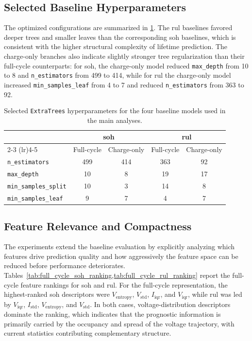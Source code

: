 \subsection{Selected Baseline Hyperparameters}

The optimized configurations are summarized in \cref{tab:baseline_hyperparams}. The \ac{rul} baselines favored deeper trees and smaller leaves than the corresponding \ac{soh} baselines, which is consistent with the higher structural complexity of lifetime prediction. The charge-only branches also indicate slightly stronger tree regularization than their full-cycle counterparts: for \ac{soh}, the charge-only model reduced \texttt{max\_depth} from 10 to 8 and \texttt{n\_estimators} from 499 to 414, while for \ac{rul} the charge-only model increased \texttt{min\_samples\_leaf} from 4 to 7 and reduced \texttt{n\_estimators} from 363 to 92.

\begin{table}[H]
    \centering
    \caption{Selected \texttt{ExtraTrees} hyperparameters for the four baseline models used in the main analyses.}
    \label{tab:baseline_hyperparams}
    \begin{tabular}{lcccc}
    \toprule
     & \multicolumn{2}{c}{\ac{soh}} & \multicolumn{2}{c}{\ac{rul}} \\
    \cmidrule(lr){2-3} \cmidrule(lr){4-5}
     & Full-cycle & Charge-only & Full-cycle & Charge-only \\
    \midrule
    \texttt{n\_estimators} & 499 & 414 & 363 & 92 \\
    \texttt{max\_depth} & 10 & 8 & 19 & 17 \\
    \texttt{min\_samples\_split} & 10 & 3 & 14 & 8 \\
    \texttt{min\_samples\_leaf} & 9 & 7 & 4 & 7 \\
    \bottomrule
    \end{tabular}
\end{table}

\subsection{Feature Relevance and Compactness}

The experiments extend the baseline evaluation by explicitly analyzing which features drive prediction quality and how aggressively the feature space can be reduced before performance deteriorates. Tables~\cref{tab:full_cycle_soh_ranking,tab:full_cycle_rul_ranking} report the full-cycle feature rankings for \ac{soh} and \ac{rul}. For the full-cycle representation, the highest-ranked \ac{soh} descriptors were \(V_{\mathrm{entropy}}\), \(V_{\mathrm{std}}\), \(I_{\mathrm{iqr}}\), and \(V_{\mathrm{iqr}}\), while \ac{rul} was led by \(V_{\mathrm{iqr}}\), \(I_{\mathrm{std}}\), \(V_{\mathrm{entropy}}\), and \(V_{\mathrm{std}}\). In both cases, voltage-distribution descriptors dominate the ranking, which indicates that the prognostic information is primarily carried by the occupancy and spread of the voltage trajectory, with current statistics contributing complementary structure.


